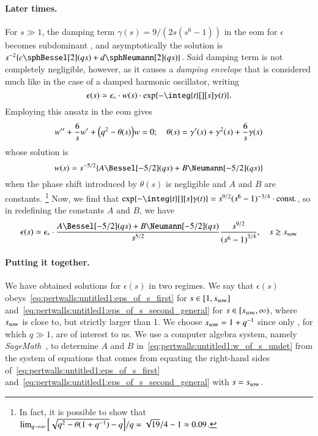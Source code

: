 \begin{draft}
\paragraph{Later times.} %
For $s\gg 1$, the damping term $\gamma(s) = 9/(2 s(s^6-1))$ in the eom for $\epsilon$ becomes subdominant , and asymptotically the solution is $s^{-2}\cclosed{c \sphBessel[2](qs) + d \sphNeumann[2](qs)  }$. Said damping term is not completely negligible, however, as it causes a \emph{damping envelope} that is considered much like in the case of a damped harmonic oscillator, writing
\begin{equation}\label{eq:pertwalls:untitled1:eps_of_s_second_general}
    \epsilon(s) \simeq \epsilon_\ast \cdot  w(s) \cdot \exp{ - \integ{t}[][s] \gamma(t) }.%
\end{equation}
Employing this ansatz in the eom gives
\begin{equation}
    w'' + \frac{6}{s} w' + {\left( q^2 - \theta(s)  \right)}w = 0; \quad \theta(s) = \gamma'(s) + \gamma^2(s) + \frac{6}{s}\gamma (s)
\end{equation}
whose solution is 
\begin{equation}\label{eq:pertwalls:untitled1:w_of_s_undet}
    w(s) \simeq s^{-5/2} \cclosed{ A \Bessel[-5/2](qs) + B \Neumann[-5/2](qs) }
\end{equation}
when the phase shift introduced by $\theta(s)$ is negligible and $A$ and $B$ are constants.%
{\footnote{In fact, it is possible to show that $\lim_{q\to \infty}{{\left[ \sqrt{q^2-\theta(1+q^{-1})}-q \right]} /q }= \sqrt{19}/4 -1 \approx 0.09$.}} %
Now, we find that $\exp{-\integ{t}[][s] \gamma(t)} =s^{9/2} (s^6-1)^{-3/4}  \cdot \text{const.}$, so in redefining the constants $A$ and $B$, we have
\begin{equation}
    \epsilon(s) \simeq \epsilon_\ast  \cdot \frac{ A \Bessel[-5/2](qs) + B \Neumann[-5/2](qs) }{s^{5/2}} \frac{s^{9/2}}{{(s^6-1)}^{3/4}}, \quad s \geq s\ped{sow}
\end{equation}



\paragraph{Putting it together.} %
We have obtained solutions for $\epsilon(s)$ in two regimes. We say that $\epsilon(s)$ obeys~\cref{eq:pertwalls:untitled1:eps_of_s_first} for $s \in [1, s_\mathrm{sow}]$ and~\cref{eq:pertwalls:untitled1:eps_of_s_second_general} for $s\in [s_\mathrm{sow}, \infty)$, where $s_\mathrm{sow}$ is close to, but strictly larger than 1. We choose $s_\mathrm{sow}=1+q^{-1}$ since only , for which $q\gg 1$, are of interest to us. We use a computer algebra system, namely \textit{SageMath}~\citep{sagemath}, to determine $A$ and $B$ in~\cref{eq:pertwalls:untitled1:w_of_s_undet} from the system of equations that comes from equating the right-hand sides of~\cref{eq:pertwalls:untitled1:eps_of_s_first} and~\cref{eq:pertwalls:untitled1:eps_of_s_second_general} with $s=s_\mathrm{sow}$. 




\end{draft}
